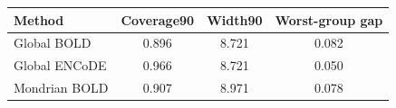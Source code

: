 \begin{tabular}{lccc}
\toprule
Method & Coverage90 & Width90 & Worst-group gap \\
\midrule
Global BOLD & 0.896 & 8.721 & 0.082 \\
Global ENCoDE & 0.966 & 8.721 & 0.050 \\
Mondrian BOLD & 0.907 & 8.971 & 0.078 \\
\bottomrule
\end{tabular}